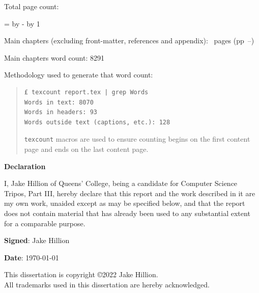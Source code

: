 \documentclass[12pt,a4paper,twoside]{report}
\newif\ifsubmission %
\begin{document}
\begin{sffamily}
\newpage

Total page count: \pageref{lastpage}

\makeatletter
\@tempcnta=\relax%
\advance\@tempcnta by -%
\advance\@tempcnta by 1%
\xdef\contentpages{\the\@tempcnta}%
\makeatother

Main chapters (excluding front-matter, references and appendix):
\contentpages~pages
(pp~\pageref{firstcontentpage}--\pageref{lastcontentpage})

Main chapters word count: 8291

Methodology used to generate that word count:

\begin{quote}
\begin{verbatim}
£ texcount report.tex | grep Words
Words in text: 8070
Words in headers: 93
Words outside text (captions, etc.): 128
\end{verbatim}

\texttt{texcount} macros are used to ensure counting begins on the first content page and ends on the last content page.
\end{quote}

\end{sffamily}

\onehalfspacing

\ifsubmission\else

\newpage
{\Huge \bf Declaration}

\vspace{24pt}

I, Jake Hillion of Queens' College, being a candidate for Computer
Science Tripos, Part III, hereby declare that this report and the
work described in it are my own work, unaided except as may be
specified below, and that the report does not contain material that
has already been used to any substantial extent for a comparable
purpose.

\vspace{60pt}
\textbf{Signed}:  Jake Hillion

\vspace{12pt}
\textbf{Date}: \today


\vfill

This dissertation is copyright \copyright 2022 Jake Hillion. 
\\
All trademarks used in this dissertation are hereby acknowledged.
\end{document}
